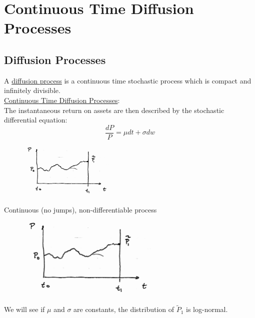 \documentclass[
14pt,notheorems,hyperref={pdfauthor=whatever}
]{beamer}
\begin{document}
\section{Continuous Time Diffusion Processes}
\subsection{Diffusion Processes}
\begin{frame}
A \underline{diffusion process} is a continuous time stochastic process which is compact and infinitely divisible.\\
\hfill\break
\underline{Continuous Time Diffusion Processes}:\\
The instantaneous return on assets are then described by the stochastic differential equation:\\
\[\frac{dP}{P} = \mu dt + \sigma dw\]
\begin{figure}[diffusion]
    \includegraphics[width=0.4\textwidth]{images/L8-diffusion.png}
    \centering
\end{figure}
\end{frame}

\begin{frame}
Continuous (no jumps), non-differentiable process\\
\begin{figure}[diffusion]
    \includegraphics[width=0.6\textwidth]{images/L8-diffusion.png}
    \centering
\end{figure}
We will see if $\mu$ and $\sigma$ are constants, the distribution of $\tilde P_1$ is log-normal.\\
\end{frame}
\end{document}
